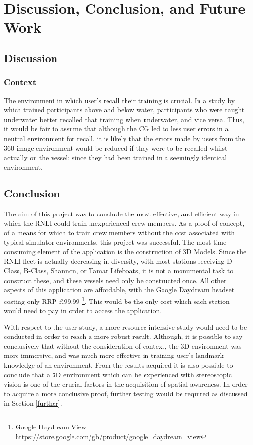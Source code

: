 \documentclass[a4paper, openright, twoside]{report}
\begin{document}
\chapter{Discussion, Conclusion, and Future Work}


\section{Discussion}

\subsection{Context}\label{context}
The environment in which user's recall their training is crucial. In a study by \cite{godden} which trained participants above and below water, participants who were taught underwater better recalled that training when underwater, and vice versa. Thus, it would be fair to assume that although the CG led to less user errors in a neutral environment for recall, it is likely that the errors made by users from the 360-image environment would be reduced if they were to be recalled whilst actually on the vessel; since they had been trained in a seemingly identical environment. 

\section{Conclusion}
The aim of this project was to conclude the most effective, and efficient way in which the RNLI could train inexperienced crew members. As a proof of concept, of a means for which to train crew members without the cost associated with typical simulator environments, this project was successful. The most time consuming element of the application is the construction of 3D Models. Since the RNLI fleet is actually decreasing in diversity, with most stations receiving D-Class, B-Class, Shannon, or Tamar Lifeboats, it is not a monumental task to construct these, and these vessels need only be constructed once. All other aspects of this application are affordable, with the Google Daydream headset costing only RRP £99.99 \footnote{Google Daydream View \url{https://store.google.com/gb/product/google_daydream_view}}. This would be the only cost which each station would need to pay in order to access the application.

With respect to the user study, a more resource intensive study would need to be conducted in order to reach a more robust result. Although, it is possible to say conclusively that without the consideration of context, the 3D environment was more immersive, and was much more effective in training user's landmark knowledge of an environment. From the results acquired it is also possible to conclude that a 3D environment which can be experienced with stereoscopic vision is one of the crucial factors in the acquisition of spatial awareness. In order to acquire a more conclusive proof, further testing would be required as discussed in Section \ref{further}.   
\end{document}
